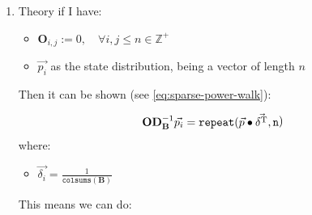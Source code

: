 \documentclass[11pt]{article}
\begin{document}
\begin{enumerate}
\item Theory
\label{sec:org0e2daff}
if I have:

\begin{itemize}
\item \(\mathbf{O}_{i, j} := 0, \quad \forall i,j\leq n \in \mathbb{Z}^+\)

\item \(\vec{p_i}\) as the state distribution, being a vector of length \(n\)
\end{itemize}

Then it can be shown (see \eqref{eq:sparse-power-walk}):

$$\begin{aligned}
    \mathbf{O} \mathbf{D}_{\mathbf{B}}^{-1} \vec{p_i} = \mathtt{repeat} (\vec{p} \bullet \vec{\delta^{\tiny \mathrm{T}}} \mathtt{, n}\end{aligned})$$
where:

\begin{itemize}
\item \(\vec{\delta_i} = \frac{1}{\mathtt{colsums} \left( \mathbf{B} \right)}\)
\end{itemize}

This means we can do:


\end{enumerate}
\end{document}
